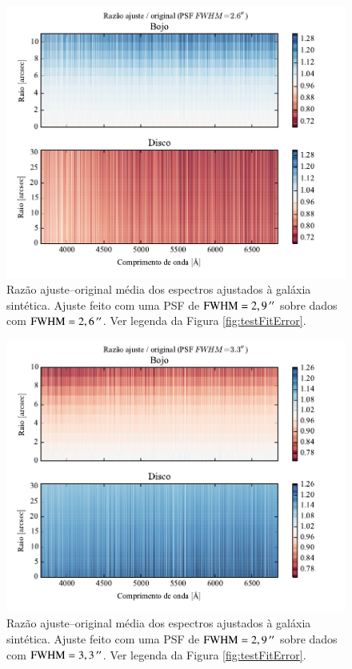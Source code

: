\begin{figure}
	\includegraphics{figuras/simulation_error_psf26}
	\caption[Razão ajuste--original (teste com PSF $\mathrm{FWHM} = 2,6\,\arcs$).]
	{Razão ajuste--original média dos espectros ajustados à galáxia sintética.
	Ajuste feito com uma PSF de $\mathrm{FWHM} = 2,9\,^{\prime\prime}$ sobre
	dados com $\mathrm{FWHM} = 2,6\,\arcs$. Ver legenda da Figura
	\ref{fig:testFitError}.}
	\label{fig:testFitError26}
\end{figure}

\begin{figure}
	\includegraphics{figuras/simulation_error_psf33}
	\caption[Razão ajuste--original (teste com PSF $\mathrm{FWHM} = 3,3\,\arcs$).]
	{Razão ajuste--original média dos espectros ajustados à galáxia sintética.
	Ajuste feito com uma PSF de $\mathrm{FWHM} = 2,9\,^{\prime\prime}$ sobre
	dados com $\mathrm{FWHM} = 3,3\,\arcs$. Ver legenda da Figura
	\ref{fig:testFitError}.}
	\label{fig:testFitError33}
\end{figure}

